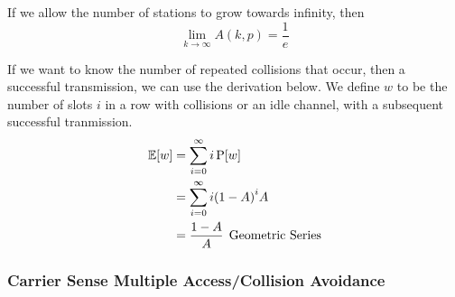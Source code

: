 If we allow the number of stations to grow towards infinity, then
\begin{equation}\label{eq:CSMACD_Performance_Infinity}
  \lim\limits_{k \rightarrow \infty} A(k, p) = \frac{1}{e}
\end{equation}

If we want to know the number of repeated collisions that occur, then a successful transmission, we can use the derivation below.
We define $w$ to be the number of slots $i$ in a row with collisions or an idle channel, with a subsequent successful tranmission.
\begin{align*}
  \operatorname{\operatorname{\mathbb{E}}}[w] &= \sum\limits_{i=0}^{\infty} i \operatorname{\operatorname{P}}[w] \\
                    &= \sum\limits_{i=0}^{\infty} i {(1-A)}^{i}A \\
                    &= \frac{1-A}{A} \:\: \text{Geometric Series}
\end{align*}


\subsubsection{Carrier Sense Multiple Access/Collision Avoidance}\label{subsubsec:CSMACA}

